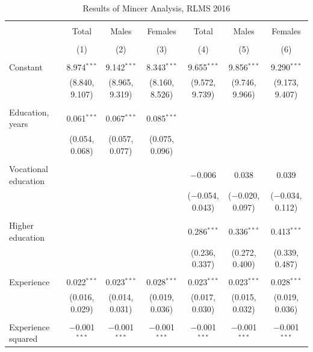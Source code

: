 \documentclass[alpha-refs]{wiley-article-01g}
\begin{document}
\begin{landscape}
	
	\fontsize{9}{11}
	\selectfont
	
	\begin{table}[!htbp] \centering 
\renewcommand{\arraystretch}{1.0}
		\caption{Results of Mincer Analysis, RLMS 2016} 
		\label{} 
		\begin{tabular}{@{\extracolsep{5pt}}lcccccc} 
			\\[-.8ex]\hline 
			\hline \\[-.8ex] 
			& Total & Males & Females & Total & Males & Females \\ 
			\\[-.8ex] & (1) & (2) & (3) & (4) & (5) & (6)\\ 
			\hline \\[-.8ex] 
			Constant & 8.974$^{***}$ & 9.142$^{***}$ & 8.343$^{***}$ & 9.655$^{***}$ & 9.856$^{***}$ & 9.290$^{***}$ \\ 
			& (8.840, 9.107) & (8.965, 9.319) & (8.160, 8.526) & (9.572, 9.739) & (9.746, 9.966) & (9.173, 9.407) \\ 
			& & & & & & \\ 
			Education, years & 0.061$^{***}$ & 0.067$^{***}$ & 0.085$^{***}$ &  &  &  \\ 
			& (0.054, 0.068) & (0.057, 0.077) & (0.075, 0.096) &  &  &  \\ 
			& & & & & & \\ 
			Vocational education &  &  &  & $-$0.006 & 0.038 & 0.039 \\ 
			&  &  &  & ($-$0.054, 0.043) & ($-$0.020, 0.097) & ($-$0.034, 0.112) \\ 
			& & & & & & \\ 
			Higher education &  &  &  & 0.286$^{***}$ & 0.336$^{***}$ & 0.413$^{***}$ \\ 
			&  &  &  & (0.236, 0.337) & (0.272, 0.400) & (0.339, 0.487) \\ 
			& & & & & & \\ 
			Experience & 0.022$^{***}$ & 0.023$^{***}$ & 0.028$^{***}$ & 0.023$^{***}$ & 0.023$^{***}$ & 0.028$^{***}$ \\ 
			& (0.016, 0.029) & (0.014, 0.031) & (0.019, 0.036) & (0.017, 0.030) & (0.015, 0.032) & (0.019, 0.036) \\ 
			& & & & & & \\ 
			Experience squared & $-$0.001$^{***}$ & $-$0.001$^{***}$ & $-$0.001$^{***}$ & $-$0.001$^{***}$ & $-$0.001$^{***}$ & $-$0.001$^{***}$ \\ 

\end{tabular}
\end{table}
\end{landscape}
\end{document}
